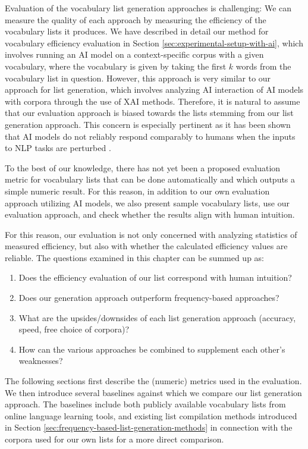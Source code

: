 Evaluation of the vocabulary list generation approaches is challenging:
We can measure the quality of each approach by measuring the efficiency of the vocabulary lists it produces.
We have described in detail our method for vocabulary efficiency evaluation in Section \ref{sec:experimental-setup-with-ai}, which involves running an AI model on a context-specific corpus with a given vocabulary, where the vocabulary is given by taking the first $k$ words from the vocabulary list in question.
However, this approach is very similar to our approach for list generation, which involves analyzing AI interaction of AI models with corpora through the use of XAI methods.
Therefore, it is natural to assume that our evaluation approach is biased towards the lists stemming from our list generation approach.
This concern is especially pertinent as it has been shown that AI models do not reliably respond comparably to humans when the inputs to NLP tasks are perturbed \cite{tjuatjaLLMsExhibitHumanlike2024}.

To the best of our knowledge, there has not yet been a proposed evaluation metric for vocabulary lists that can be done automatically and which outputs a simple numeric result.
For this reason, in addition to our own evaluation approach utilizing AI models, we also present sample vocabulary lists, use our evaluation approach, and check whether the results align with human intuition.

For this reason, our evaluation is not only concerned with analyzing statistics of measured efficiency, but also with whether the calculated efficiency values are reliable.
The questions examined in this chapter can be summed up as:
\begin{enumerate}
	\item Does the efficiency evaluation of our list correspond with human intuition?
	\item Does our generation approach outperform frequency-based approaches?
	\item What are the upsides/downsides of each list generation approach (accuracy, speed, free choice of corpora)?
	\item How can the various approaches be combined to supplement each other's weaknesses?
\end{enumerate}

The following sections first describe the (numeric) metrics used in the evaluation.
We then introduce several baselines against which we compare our list generation approach.
The baselines include both publicly available vocabulary lists from online language learning tools, and existing list compilation methods introduced in Section \ref{sec:frequency-based-list-generation-methods} in connection with the corpora used for our own lists for a more direct comparison.

